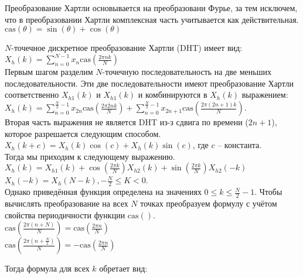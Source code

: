 \documentclass[12pt, a4paper] {ncc}
\newcommand{\cas}{\text{cas}}
\begin{document}
Преобразование Хартли основывается на преобразовани Фурье, за тем исключем, что 
в преобразовании Хартли комплексная часть учитывается как действительная.\\

$\cas(\theta) = \sin(\theta) + \cos(\theta)$

$N$-точечное дискретное преобразование Хартли (DHT) имеет вид:\\

$X_h(k) = \sum^{N - 1}_{ n = 0 } x_n \cas(\frac{2 \pi nk} {N})$ \\

Первым шагом разделим $N$-точечную последовательность на две меньших последовательности.
Эти две последовательности имеют преобразование Хартли
соответственно $X_{h1}(k)$ и $X_{h1}(k)$ и комбинируются в $X_h(k)$ выражением: \\


$X_h(k) = \sum^{\frac N 2 - 1}_{n = 0} x_{2n} \cas(\frac{2\pi 2 nk} N) +
 		  \sum^{\frac N 2 - 1}_{n = 0} x_{2n+1} \cas(\frac{2\pi (2n + 1)k} N)$.\\

Вторая часть выражения не является DHT из-з сдвига по времени ($2n + 1$), которое разрешается следующим
способом.\\


$X_h(k + c) = X_h(k)\cos(c) + X_h(k)\sin(c)$, где $c$ -- константа.\\


Тогда мы приходим к следующему выражению. \\


$X_h(k) = X_{h1}(k) + \cos(\frac{2\pi k} N) X_{h2}(k) + \sin(\frac{2\pi k} N) X_{h2}(-k)$ \\

$X_h(-k) = X_h(N - k), - \frac N 2 \leq K < 0$. \\ 


Однако приведённая функция определена на значениях $ 0 \leq k \leq \frac N 2 - 1$. Чтобы вычислять преобразование
на всех $N$ точках преобразуем формулу с учётом свойства периодичности функции $\cas()$. \\

$\cas(\frac{2\pi (n + N)} N) = \cas(\frac{2\pi n} N)$ \\

$\cas(\frac{2\pi (n + \frac{N}{2})} N) = - \cas(\frac{2\pi n} N)$


Тогда формула для всех $k$ обретает вид:\\
\end{document}
